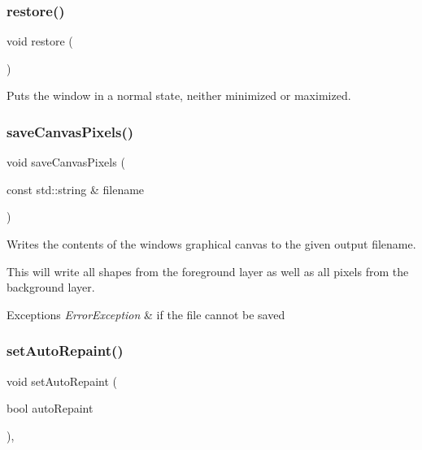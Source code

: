 \subsubsection{\texorpdfstring{restore()}{restore()}}
{\footnotesize\ttfamily void restore (\begin{DoxyParamCaption}{ }\end{DoxyParamCaption})\hspace{0.3cm}{\ttfamily [virtual]}}



Puts the window in a normal state, neither minimized or maximized. 

\mbox{\label{classsgl_1_1GWindow_aba99f6a53d9bb0493e7fc3ead6a2e4a3}} 
\subsubsection{\texorpdfstring{save\+Canvas\+Pixels()}{saveCanvasPixels()}}
{\footnotesize\ttfamily void save\+Canvas\+Pixels (\begin{DoxyParamCaption}\item[{const std\+::string \&}]{filename }\end{DoxyParamCaption})\hspace{0.3cm}{\ttfamily [virtual]}}



Writes the contents of the window\textquotesingle{}s graphical canvas to the given output filename. 

This will write all shapes from the foreground layer as well as all pixels from the background layer. 
\begin{DoxyExceptions}{Exceptions}
{\em Error\+Exception} & if the file cannot be saved \\
\hline
\end{DoxyExceptions}
\mbox{\label{classsgl_1_1GForwardDrawingSurface_acb65220cc16d17df02a0c08d35b60988}} 
\subsubsection{\texorpdfstring{set\+Auto\+Repaint()}{setAutoRepaint()}}
{\footnotesize\ttfamily void set\+Auto\+Repaint (\begin{DoxyParamCaption}\item[{bool}]{auto\+Repaint }\end{DoxyParamCaption})\hspace{0.3cm}{\ttfamily [override]}, {\ttfamily [inherited]}}

